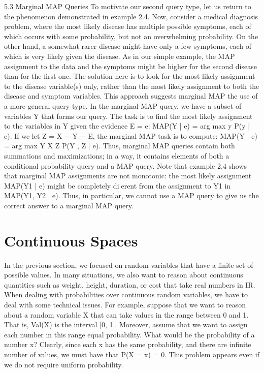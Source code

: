 5.3 Marginal MAP Queries
To motivate our second query type, let us return to the phenomenon demonstrated in example 2.4. Now, consider a medical diagnosis problem, where the most likely disease has multiple possible symptoms, each of which occurs with some probability, but not an overwhelming probability. On the other hand, a somewhat rarer disease might have only a few symptoms, each of which is very likely given the disease. As in our simple example, the MAP assignment to the data and the symptoms might be higher for the second disease than for the first one. The solution here is to look for the most likely assignment to the disease variable(s) only, rather than the most likely assignment to both the disease and symptom variables. This approach suggests marginal MAP the use of a more general query type. In the marginal MAP query, we have a subset of variables Y that forms our query. The task is to find the most likely assignment to the variables in Y given the evidence E = e: MAP(Y | e) = arg max y P(y | e). If we let Z = X − Y − E, the marginal MAP task is to compute: MAP(Y | e) = arg max Y X Z P(Y , Z | e). Thus, marginal MAP queries contain both summations and maximizations; in a way, it contains elements of both a conditional probability query and a MAP query. Note that example 2.4 shows that marginal MAP assignments are not monotonic: the most likely assignment MAP(Y1 | e) might be completely dierent from the assignment to Y1 in MAP({Y1, Y2} | e). Thus, in particular, we cannot use a MAP query to give us the correct answer to a marginal MAP query.

\section{Continuous Spaces}
In the previous section, we focused on random variables that have a finite set of possible values. In many situations, we also want to reason about continuous quantities such as weight, height, duration, or cost that take real numbers in IR. When dealing with probabilities over continuous random variables, we have to deal with some technical issues. For example, suppose that we want to reason about a random variable X that can take values in the range between 0 and 1. That is, Val(X) is the interval [0, 1]. Moreover, assume that we want to assign each number in this range equal probability. What would be the probability of a number x? Clearly, since each x has the same probability, and there are infinite number of values, we must have that P(X = x) = 0. This problem appears even if we do not require uniform probability.

